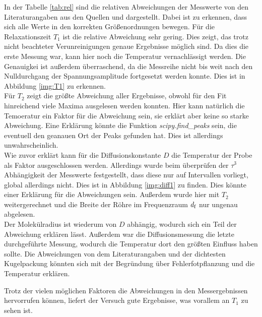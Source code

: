 \noindent
In der Tabelle \ref{tab:rel} sind die relativen Abweichungen der Messwerte von den Literaturangaben aus den Quellen \cite{theo} und \cite{radius} dargestellt.
Dabei ist zu erkennen, dass sich alle Werte in den korrekten Größenordnungen bewegen. Für die Relaxationszeit $T_1$ ist die relative Abweichung sehr gering. 
Dies zeigt, das trotz nicht beachteter Verunreinigungen genaue Ergebnisse möglich sind. Da dies die erste Messung war, kann hier noch die Temperatur vernachlässigt werden. 
Die Genauigkei ist außerdem überraschend, da die Messreihe nicht bis weit nach den Nulldurchgang der Spannungsamplitude fortgesetzt werden konnte. Dies ist in Abbildung \ref{img:T1} zu erkennen.\\
Für $T_2$ zeigt die größte Abweichung aller Ergebnisse, obwohl für den Fit hinreichend viele Maxima ausgelesen werden konnten. 
Hier kann natürlich die Temoeratur ein Faktor für die Abweichung sein, sie erklärt aber keine so starke Abweichung. 
Eine Erklärung könnte die Funktion \textit{scipy.find\_peaks} sein, die eventuell den geanauen Ort der Peaks gefunden hat. Dies ist allerdings unwahrscheinlich.\\
Wie zuvor erklärt kann für die Diffusionskonstante $D$ die Temperatur der Probe als Faktor ausgeschlossen werden. 
Allerdings wurde beim überprüfen der $\tau^3$ Abhängigkeit der Messwerte festgestellt, dass diese nur auf Intervallen vorliegt, global allerdings nicht.
Dies ist in Abbildung \ref{img:diff1} zu finden. Dies könnte einer Erklärung für die Abweichungen sein. Außerdem wurde hier mit $T_2$ weitergerechnet 
und die Breite der Röhre im Frequenzraum $d_{\text{f}}$ nur ungenau abgelesen.\\
Der Molekülradius ist wiederum von $D$ abhängig, wodurch sich ein Teil der Abweichung erklären lässt. 
Außerdem war die Diffusionsmessung die letzte durchgeführte Messung, wodurch die Temperatur dort den größten Einfluss haben sollte.
Die Abweichungen von dem Literaturangaben und der dichtesten Kugelpackung könnten sich mit der Begründung über Fehlerfotpflanzung und die Temperatur erklären.


\noindent
Trotz der vielen möglichen Faktoren die Abweichungen in den Messergebnissen hervorrufen können, liefert der Versuch gute Ergebnisse, was vorallem an $T_1$ zu sehen ist.
